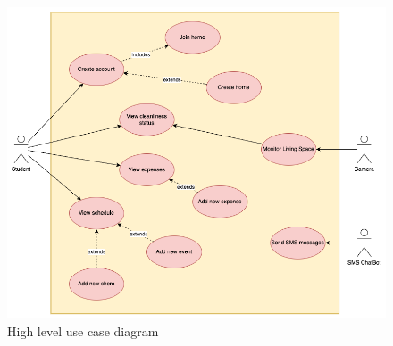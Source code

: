 \documentclass{scrreprt}
\theoremstyle{definition}
\begin{document}
\begin{figure}[H]
    \includegraphics[width=\linewidth]{./img/use-case-diagram.png}
    \caption{High level use case diagram}
    \label{fig: High level use case diagram}
\end{figure}
\end{document}
